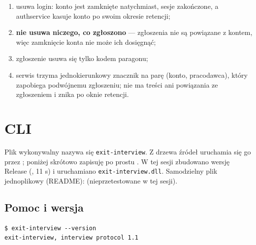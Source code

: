 {\begin{enumerate}[leftmargin=*,itemsep=2pt]
  \item usuwa login: konto jest zamknięte natychmiast, sesje zakończone, a
        authservice kasuje konto po swoim okresie retencji;
  \item \textbf{nie usuwa niczego, co zgłoszono} --- zgłoszenia nie są powiązane
        z kontem, więc zamknięcie konta nie może ich dosięgnąć;
  \item zgłoszenie usuwa się tylko kodem paragonu;
  \item serwis trzyma jednokierunkowy znacznik na parę (konto, pracodawca),
        który zapobiega podwójnemu zgłoszeniu; nie ma treści ani powiązania ze
        zgłoszeniem i znika po oknie retencji.
\end{enumerate}


\section{CLI}
\label{sec:cli}

Plik wykonywalny nazywa się \texttt{exit-interview}. Z drzewa źródeł uruchamia
się go przez ;
poniżej skrótowo zapisuję po prostu . W tej sesji
zbudowano wersję Release (, 11 s) i uruchamiano \texttt{exit-\allowbreak{}interview.\allowbreak{}dll}. Samodzielny
plik jednoplikowy (README): 
(nieprzetestowane w tej sesji).

\subsection{Pomoc i wersja}

\begin{Verbatim}[fontsize=\scriptsize,frame=single,framesep=2mm]
$ exit-interview --version
exit-interview, interview protocol 1.1


\end{Verbatim}}
